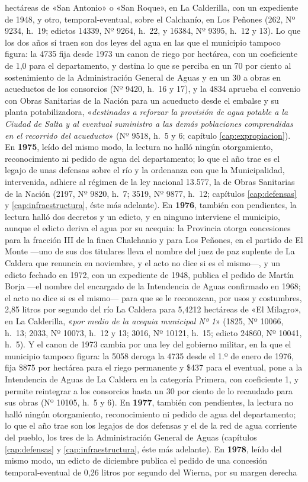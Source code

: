 {hectáreas de «San Antonio» o «San Roque», en La Calderilla, con un expediente de 1948, y otro, temporal-eventual, sobre el Calchanío, en Los Peñones (262, Nº 9234, h.\ 19; edictos 14339, Nº 9264, h.\ 22, y 16384, Nº 9395, h.\ 12 y 13). Lo que los dos años sí traen son dos leyes del agua en las que el municipio tampoco figura: la 4735 fija desde 1973 un canon de riego por hectárea, con un coeficiente de 1,0 para el departamento, y destina lo que se perciba en un 70 por ciento al sostenimiento de la Administración General de Aguas y en un 30 a obras en acueductos de los consorcios (Nº 9420, h.\ 16 y 17), y la 4834 aprueba el convenio con Obras Sanitarias de la Nación para un acueducto desde el embalse y su planta potabilizadora, «\textit{destinadas a reforzar la provisión de agua potable a la Ciudad de Salta y al eventual suministro a las demás poblaciones comprendidas en el recorrido del acueducto}» (Nº 9518, h.\ 5 y 6; capítulo \ref{cap:expropiacion}). En \textbf{1975}, leído del mismo modo, la lectura no halló ningún otorgamiento, reconocimiento ni pedido de agua del departamento; lo que el año trae es el legajo de unas defensas sobre el río y la ordenanza con que la Municipalidad, intervenida, adhiere al régimen de la ley nacional 13.577, la de Obras Sanitarias de la Nación (2197, Nº 9820, h.\ 7; 3519, Nº 9877, h.\ 12; capítulos \ref{cap:defensas} y \ref{cap:infraestructura}, éste más adelante). En \textbf{1976}, también con pendientes, la lectura halló dos decretos y un edicto, y en ninguno interviene el municipio, aunque el edicto deriva el agua por su acequia: la Provincia otorga concesiones para la fracción III de la finca Chalchanio y para Los Peñones, en el partido de El Monte ---uno de sus dos titulares lleva el nombre del juez de paz suplente de La Caldera que renuncia en noviembre, y el acto no dice si es el mismo---, y un edicto fechado en 1972, con un expediente de 1948, publica el pedido de Martín Borja ---el nombre del encargado de la Intendencia de Aguas confirmado en 1968; el acto no dice si es el mismo--- para que se le reconozcan, por usos y costumbres, 2,85 litros por segundo del río La Caldera para 5,4212 hectáreas de «El Milagro», en La Calderilla, «\textit{por medio de la acequia municipal Nº 1}» (1825, Nº 10066, h.\ 13; 2033, Nº 10073, h.\ 12 y 13; 3016, Nº 10121, h.\ 15; edicto 24860, Nº 10041, h.\ 5). Y el canon de 1973 cambia por una ley del gobierno militar, en la que el municipio tampoco figura: la 5058 deroga la 4735 desde el 1.º de enero de 1976, fija \$875 por hectárea para el riego permanente y \$437 para el eventual, pone a la Intendencia de Aguas de La Caldera en la categoría Primera, con coeficiente 1, y permite reintegrar a los consorcios hasta un 30 por ciento de lo recaudado para sus obras (Nº 10105, h.\ 5 y 6). En \textbf{1977}, también con pendientes, la lectura no halló ningún otorgamiento, reconocimiento ni pedido de agua del departamento; lo que el año trae son los legajos de dos defensas y el de la red de agua corriente del pueblo, los tres de la Administración General de Aguas (capítulos \ref{cap:defensas} y \ref{cap:infraestructura}, éste más adelante). En \textbf{1978}, leído del mismo modo, un edicto de diciembre publica el pedido de una concesión temporal-eventual de 0,26 litros por segundo del Wierna, por su margen derecha }
